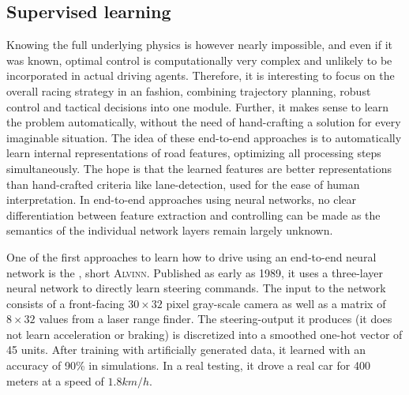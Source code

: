\subsection{Supervised learning}

Knowing the full underlying physics is however nearly impossible, and even if it was known, optimal control is computationally very complex and unlikely to be incorporated in actual driving agents. Therefore, it is interesting to focus on the overall racing strategy in an  fashion, combining trajectory planning, robust control and tactical decisions into one module. Further, it makes sense to learn the problem automatically, without the need of hand-crafting a solution for every imaginable situation. The idea of these end-to-end approaches is to automatically learn internal representations of road features, optimizing all processing steps simultaneously. The hope is that the learned features are better representations than hand-crafted criteria like lane-detection, used for the ease of human interpretation. In end-to-end approaches using neural networks, no clear differentiation between feature extraction and controlling can be made as the semantics of the individual network layers remain largely unknown.

One of the first approaches to learn how to drive using an end-to-end neural network is the , short \textsc{Alvinn}\cite{pomerleau_alvinn:_1989}. Published as early as 1989, it uses a three-layer neural network to directly learn steering commands. The input to the network consists of a front-facing $30\times32$ pixel gray-scale camera as well as a matrix of $8\times32$ values from a laser range finder. The steering-output it produces (it does not learn acceleration or braking) is discretized into a smoothed one-hot vector of 45 units. After training with artificially generated data, it learned with an accuracy of 90\% in simulations. In a real testing, it drove a real car for 400 meters at a speed of $1.8 km/h$. 

